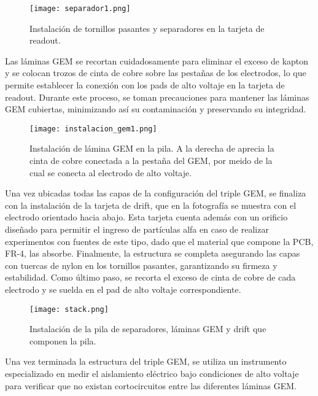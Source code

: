 \documentclass{report}
\begin{document}
\begin{figure}[H]
    \centering
    \texttt{[image: separador1.png]}
    \caption{Instalación de tornillos pasantes y separadores en la tarjeta de readout.}
    \label{fig:separador1}
\end{figure}

\noindent Las láminas GEM se recortan cuidadosamente para eliminar el exceso de kapton y se colocan trozos de cinta de cobre sobre las pestañas de los electrodos, lo que permite establecer la conexión con los pads de alto voltaje en la tarjeta de readout. Durante este proceso, se toman precauciones para mantener las láminas GEM cubiertas, minimizando así su contaminación y preservando su integridad.\\

\begin{figure}[H]
    \centering
    \texttt{[image: instalacion\_gem1.png]}
    \caption{Instalación de lámina GEM en la pila. A la derecha de aprecia la cinta de cobre conectada a la pestaña del GEM, por meido de la cual se conecta al electrodo de alto voltaje.}
    \label{fig:gem1}
\end{figure}

\noindent Una vez ubicadas todas las capas de la configuración del triple GEM, se finaliza con la instalación de la tarjeta de drift, que en la fotografía se muestra con el electrodo orientado hacia abajo. Esta tarjeta cuenta además con un orificio diseñado para permitir el ingreso de partículas alfa en caso de realizar experimentos con fuentes de este tipo, dado que el material que compone la PCB, FR-4, las absorbe. Finalmente, la estructura se completa asegurando las capas con tuercas de nylon en los tornillos pasantes, garantizando su firmeza y estabilidad. Como último paso, se recorta el exceso de cinta de cobre de cada electrodo y se suelda en el pad de alto voltaje correspondiente.\\

\begin{figure}[H]
    \centering
    \texttt{[image: stack.png]}
    \caption{Instalación de la pila de separadores, láminas GEM y drift que componen la pila.}
    \label{fig:stack}
\end{figure}

\noindent Una vez terminada la estructura del triple GEM, se utiliza un instrumento especializado en medir el aislamiento eléctrico bajo condiciones de alto voltaje para verificar que no existan cortocircuitos entre las diferentes láminas GEM.\\
\end{document}
